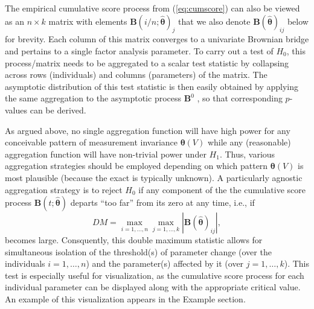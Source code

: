 \documentclass[man]{apa}
\begin{document}
The empirical cumulative score process from (\ref{eq:cumscore}) can also be viewed
as an $n \times k$ matrix with elements ${\bm B}(i/n; \hat {\bm \theta})_j$ that
we also denote ${\bm B}(\hat {\bm \theta})_{ij}$ below for brevity.
Each column of this matrix converges to a univariate Brownian bridge and pertains
to a single factor analysis parameter. To carry out a test of $H_0$, this process/matrix
needs to be aggregated to a scalar test statistic by collapsing across
rows (individuals) and columns (parameters) of the matrix. The asymptotic distribution
of this test statistic is then easily obtained by applying the same
aggregation to the asymptotic process ${\bm B}^0$ \cite{HjoKon02,ZeiHor07},
so that corresponding $p$-values can be derived.

As argued above, no single aggregation function will have high power for any
conceivable pattern of measurement invariance ${\bm \theta}(V)$ while any
(reasonable) aggregation function will have non-trivial power under $H_1$.
Thus, various aggregation strategies should be employed depending on which
pattern ${\bm \theta}(V)$ is most plausible (because the exact is typically
unknown). A particularly agnostic aggregation strategy is to reject $H_0$
if any component of the the cumulative score process ${\bm B}(t; \hat {\bm \theta})$
departs ``too far'' from its zero at any time, i.e., if
\begin{equation}
    \label{eq:dmax}
    \mathit{DM} = \max_{i = 1,\dots, n} \max_{j = 1, \dots, k} | {\bm B}(\hat {\bm \theta})_{ij} |,
\end{equation}
becomes large. Consquently, this double maximum statistic allows for simultaneous
isolation of the threshold(s) of parameter change (over the individuals $i = 1, \dots, n$)
and the parameter(s) affected by it (over $j = 1, \dots, k$). This test is
especially useful for visualization, as the cumulative score process for
each individual parameter can be displayed along with the appropriate
critical value.  An example of this visualization appears in the
Example section.
\end{document}
